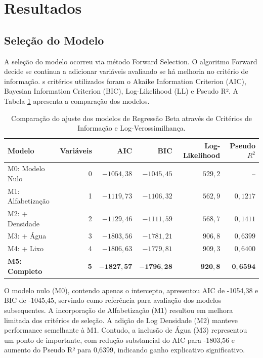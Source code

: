 \documentclass[12pt, a4paper]{article}
\begin{document}
\section{Resultados}

\subsection{Seleção do Modelo}

A seleção do modelo ocorreu via método Forward Selection. O algoritmo Forward decide se continua a adicionar variáveis avaliando se há melhoria no critério de informação. s critérios utilizados foram o Akaike Information Criterion (AIC), Bayesian Information Criterion (BIC), Log-Likelihood (LL) e Pseudo R². A Tabela \ref{tab:selecao_modelos} apresenta a comparação dos modelos.

\begin{table}[H]
\centering
\caption{Comparação do ajuste dos modelos de Regressão Beta através de Critérios de Informação e Log-Verossimilhança.}
\label{tab:selecao_modelos}
\begin{tabular}{lrrrrr}
\toprule
\textbf{Modelo} & \textbf{Variáveis} & \textbf{AIC} & \textbf{BIC} & \textbf{Log-Likelihood} & \textbf{Pseudo $R^2$} \\
\midrule
M0: Modelo Nulo         & 0 & $-1054,38$ & $-1045,45$ & $529,2$ & -- \\
M1: Alfabetização       & 1 & $-1119,73$ & $-1106,32$ & $562,9$ & $0,1217$ \\
M2: + Densidade         & 2 & $-1129,46$ & $-1111,59$ & $568,7$ & $0,1411$ \\
M3: + Água              & 3 & $-1803,56$ & $-1781,21$ & $906,8$ & $0,6399$ \\
M4: + Lixo              & 4 & $-1806,63$ & $-1779,81$ & $909,3$ & $0,6400$ \\
\textbf{M5: Completo}   & \textbf{5} & $\mathbf{-1827,57}$ & $\mathbf{-1796,28}$ & $\mathbf{920,8}$ & $\mathbf{0,6594}$ \\
\bottomrule
\end{tabular}
\end{table}

O modelo nulo (M0), contendo apenas o intercepto, apresentou AIC de -1054,38 e BIC de -1045,45, servindo como referência para avaliação dos modelos subsequentes. A incorporação de Alfabetização (M1) resultou em melhora limitada dos critérios de seleção. A adição de Log Densidade (M2) manteve performance semelhante à M1. Contudo, a inclusão de Água (M3) representou um ponto de importante, com redução substancial do AIC para -1803,56 e aumento do Pseudo R² para 0,6399, indicando ganho explicativo significativo.
\end{document}
